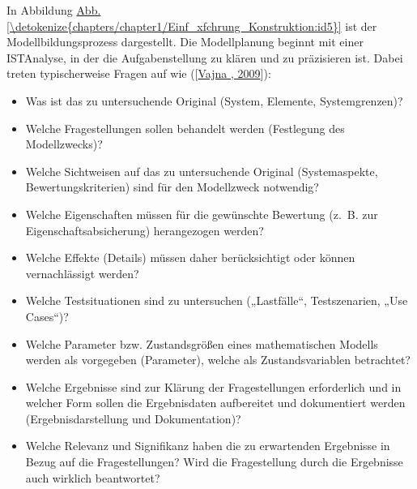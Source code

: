 \documentclass[letterpaper,10pt,german]{jupyterBook}
\begin{document}
\sphinxAtStartPar
In Abbildung \hyperref[\detokenize{chapters/chapter1/Einf_xfchrung_Konstruktion:id5}]{Abb.\@ \ref{\detokenize{chapters/chapter1/Einf_xfchrung_Konstruktion:id5}}} ist der Modellbildungsprozess dargestellt. Die Modellplanung beginnt mit einer IST\sphinxhyphen{}Analyse, in der die Aufgabenstellung zu klären und zu präzisieren ist. Dabei treten typischerweise Fragen auf wie ({[}\hyperlink{cite.quellen:id16}{Vajna , 2009}{]}):
\begin{itemize}
\item {} 
\sphinxAtStartPar
Was ist das zu untersuchende Original (System, Elemente, Systemgrenzen)?

\item {} 
\sphinxAtStartPar
Welche Fragestellungen sollen behandelt werden (Festlegung des Modellzwecks)?

\item {} 
\sphinxAtStartPar
Welche Sichtweisen auf das zu untersuchende Original (Systemaspekte, Bewertungskriterien) sind für den Modellzweck notwendig?

\item {} 
\sphinxAtStartPar
Welche Eigenschaften müssen für die gewünschte Bewertung (z. B. zur Eigenschaftsabsicherung) herangezogen werden?

\item {} 
\sphinxAtStartPar
Welche Effekte (Details) müssen daher berücksichtigt oder können vernachlässigt werden?

\item {} 
\sphinxAtStartPar
Welche Testsituationen sind zu untersuchen („Lastfälle“, Testszenarien, „Use Cases“)?

\item {} 
\sphinxAtStartPar
Welche Parameter bzw. Zustandsgrößen eines mathematischen Modells werden als vorgegeben (Parameter), welche als Zustandsvariablen betrachtet?

\item {} 
\sphinxAtStartPar
Welche Ergebnisse sind zur Klärung der Fragestellungen erforderlich und in welcher Form sollen die Ergebnisdaten aufbereitet und dokumentiert werden (Ergebnisdarstellung und Dokumentation)?

\item {} 
\sphinxAtStartPar
Welche Relevanz und Signifikanz haben die zu erwartenden Ergebnisse in Bezug auf die Fragestellungen? Wird die Fragestellung durch die Ergebnisse auch wirklich beantwortet?

\end{itemize}
\end{document}
